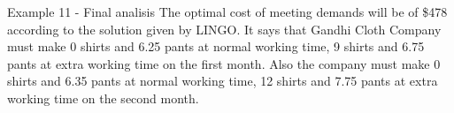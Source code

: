 \begin{frame}{Example 11 - Final analisis}
The optimal cost of meeting demands will be of \$478 according to the
solution given by LINGO. It says that Gandhi Cloth Company must make
0 shirts  and 6.25 pants at normal working time, 9 shirts and 6.75 pants
at extra working time on the first month. Also the company must make
0 shirts and 6.35 pants at normal working time, 12 shirts and 7.75 pants
at extra working time on the second month.



\end{frame}
